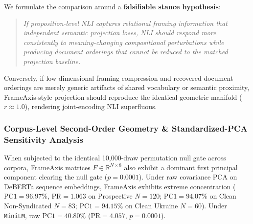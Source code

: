 We formulate the comparison around a \textbf{falsifiable stance hypothesis}:
\begin{quote}
\emph{If proposition-level NLI captures relational framing information that independent semantic projection loses, NLI should respond more consistently to meaning-changing compositional perturbations while producing document orderings that cannot be reduced to the matched projection baseline.}
\end{quote}
Conversely, if low-dimensional framing compression and recovered document orderings are merely generic artifacts of shared vocabulary or semantic proximity, FrameAxis-style projection should reproduce the identical geometric manifold ($r \approx 1.0$), rendering joint-encoding NLI superfluous.

\subsubsection{Corpus-Level Second-Order Geometry \& Standardized-PCA Sensitivity Analysis}

When subjected to the identical 10,000-draw permutation null gate across corpora, FrameAxis matrices $F \in \mathbb{R}^{N \times 8}$ also exhibit a dominant first principal component clearing the null gate ($p = 0.0001$). Under raw covariance PCA on DeBERTa sequence embeddings, FrameAxis exhibits extreme concentration ($\mathrm{PC1} = 96.97\%$, $\mathrm{PR} = 1.063$ on Prospective $N=120$; $\mathrm{PC1} = 94.07\%$ on Clean Non-Syndicated $N=83$; $\mathrm{PC1} = 94.15\%$ on Clean Ukraine $N=60$). Under \texttt{MiniLM}, raw $\mathrm{PC1} = 40.80\%$ ($\mathrm{PR} = 4.057$, $p = 0.0001$).

